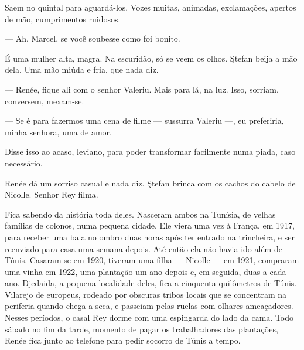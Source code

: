 Saem no quintal para aguardá-los. Vozes muitas, animadas, exclamações,
apertos de mão, cumprimentos ruidosos.

--- Ah, Marcel, se você soubesse como foi bonito.


É uma mulher alta, magra. Na escuridão, só se veem os olhos. Ştefan
beija a mão dela. Uma mão miúda e fria, que nada diz.

\asterisc


--- Renée, fique ali com o senhor Valeriu. Mais para lá, na luz. Isso,
sorriam, conversem, mexam-se.

--- Se é para fazermos uma cena de filme --- sussurra Valeriu ---, eu
preferiria, minha senhora, uma de amor.

Disse isso ao acaso, leviano, para poder transformar facilmente numa
piada, caso necessário.

Renée dá um sorriso casual e nada diz. Ştefan brinca com os cachos do
cabelo de Nicolle. Senhor Rey filma.

\asterisc

Fica sabendo da história toda deles. Nasceram ambos na Tunísia, de velhas
famílias de colonos, numa pequena cidade. Ele viera uma vez à França, em
1917, para receber uma bala no ombro duas horas após ter entrado na
trincheira, e ser reenviado para casa uma semana depois. Até então ela
não havia ido além de Túnis. Casaram-se em 1920, tiveram uma filha ---
Nicolle --- em 1921, compraram uma vinha em 1922, uma plantação um ano
depois e, em seguida, duas a cada ano. Djedaida, a pequena localidade
deles, fica a cinquenta quilômetros de Túnis. Vilarejo de europeus,
rodeado por obscuras tribos locais que se concentram na periferia quando
chega a seca, e passeiam pelas ruelas com olhares ameaçadores. Nesses
períodos, o casal Rey dorme com uma espingarda do lado da cama. Todo
sábado no fim da tarde, momento de pagar os trabalhadores das
plantações, Renée fica junto ao telefone para pedir socorro de Túnis a
tempo.


